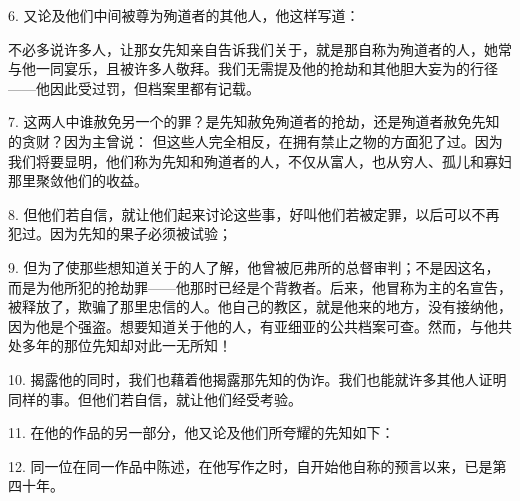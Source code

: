 \par

6. 又论及他们中间被尊为殉道者的其他人，他这样写道：\par

不必多说许多人，让那女先知亲自告诉我们关于，就是那自称为殉道者的人，她常与他一同宴乐，且被许多人敬拜。我们无需提及他的抢劫和其他胆大妄为的行径——他因此受过罚，但档案里都有记载。\par

7. 这两人中谁赦免另一个的罪？是先知赦免殉道者的抢劫，还是殉道者赦免先知的贪财？因为主曾说： 但这些人完全相反，在拥有禁止之物的方面犯了过。因为我们将要显明，他们称为先知和殉道者的人，不仅从富人，也从穷人、孤儿和寡妇那里聚敛他们的收益。\par

8. 但他们若自信，就让他们起来讨论这些事，好叫他们若被定罪，以后可以不再犯过。因为先知的果子必须被试验；\par

9. 但为了使那些想知道关于的人了解，他曾被厄弗所的总督审判；不是因这名，而是为他所犯的抢劫罪——他那时已经是个背教者。后来，他冒称为主的名宣告，被释放了，欺骗了那里忠信的人。他自己的教区，就是他来的地方，没有接纳他，因为他是个强盗。想要知道关于他的人，有亚细亚的公共档案可查。然而，与他共处多年的那位先知却对此一无所知！\par

10. 揭露他的同时，我们也藉着他揭露那先知的伪诈。我们也能就许多其他人证明同样的事。但他们若自信，就让他们经受考验。\par

11. 在他的作品的另一部分，他又论及他们所夸耀的先知如下：\par

\par

12. 同一位在同一作品中陈述，在他写作之时，自开始他自称的预言以来，已是第四十年。\par

